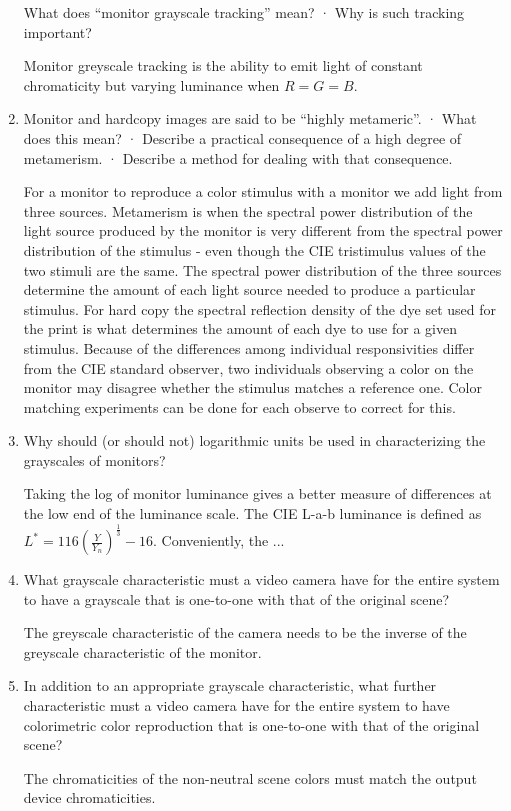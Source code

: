 \begin{enumerate}
 What does “monitor grayscale tracking” mean? · Why is such tracking important?
 \par Monitor greyscale tracking is the ability to emit light of constant chromaticity but varying luminance when $R=G=B$.
 \item
 Monitor and hardcopy images are said to be “highly metameric”. · What does this mean? · Describe a practical consequence of a high degree of metamerism. · Describe a method for dealing with that consequence.
 \par For a monitor to reproduce a color stimulus with a monitor we add light from three sources.    Metamerism is when the spectral power distribution of the light source produced by the monitor is very different from the spectral power distribution of the stimulus - even though the CIE tristimulus values of the two stimuli are the same.  The spectral power distribution of the three sources determine the amount of each light source needed to produce a particular stimulus.  For hard copy the spectral reflection density of the dye set used for the print is what determines the amount of each dye to use for a given stimulus.  Because of the differences among individual responsivities differ from the CIE standard observer, two individuals observing a color on the monitor may disagree whether the stimulus matches a reference one.  Color matching experiments can be done for each observe to correct for this.
 \item
 Why should (or should not) logarithmic units be used in characterizing the grayscales of monitors?
 \par Taking the log of monitor luminance gives a better measure of differences at the low end of the luminance scale. The CIE L-a-b luminance is defined as  $L^{*}=116 (\frac{Y}{Y_n})^{\frac{1}{3}} -16 $.  Conveniently, the ...
 \item
 What grayscale characteristic must a video camera have for the entire system to have a grayscale that is one-to-one with that of the original scene?
 \par The greyscale characteristic of the camera needs to be the inverse of the greyscale characteristic of the monitor.
 \item
  In addition to an appropriate grayscale characteristic, what further characteristic must a video camera have for the entire system to have colorimetric color reproduction that is one-to-one with that of the original scene? \newline
 \par The chromaticities of the non-neutral scene colors must match the output device chromaticities. \newline

\end{enumerate}
